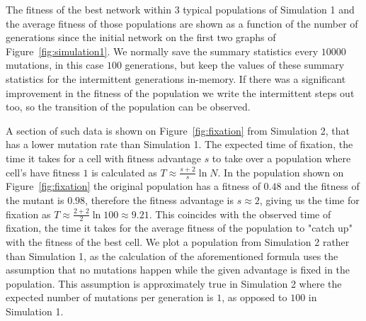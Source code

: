 \documentclass[a4paper,12pt]{article}
\begin{document}
The fitness of the best network within $3$ typical populations of Simulation 1 and the average fitness of those populations are shown as a function of the number of generations since the initial network on the first two graphs of Figure~\ref{fig:simulation1}. We normally save the summary statistics every $10000$ mutations, in this case $100$ generations, but keep the values of these summary statistics for the intermittent generations in-memory. If there was a significant improvement in the fitness of the population we write the intermittent steps out too, so the transition of the population can be observed. 

A section of such data is shown on Figure~\ref{fig:fixation} from Simulation 2, that has a lower mutation rate than Simulation 1. The expected time of fixation, the time it takes for a cell with fitness advantage $s$ to take over a population where cell's have fitness $1$ is calculated as $T \approx \frac{s+2}{s}\ln N$. \cite{barteklecture} In the population shown on Figure~\ref{fig:fixation} the original population has a fitness of $0.48$ and the fitness of the mutant is $0.98$, therefore the fitness advantage is $s\approx2$, giving us the time for fixation as $T\approx \frac{2+2}{2}\ln 100 \approx 9.21$. This coincides with the observed time of fixation, the time it takes for the average fitness of the population to "catch up" with the fitness of the best cell. We plot a population from Simulation 2 rather than Simulation 1, as the calculation of the aforementioned formula uses the assumption that no mutations happen while the given advantage is fixed in the population. This assumption is approximately true in Simulation 2 where the expected number of mutations per generation is $1$, as opposed to $100$ in Simulation 1.
\end{document}
